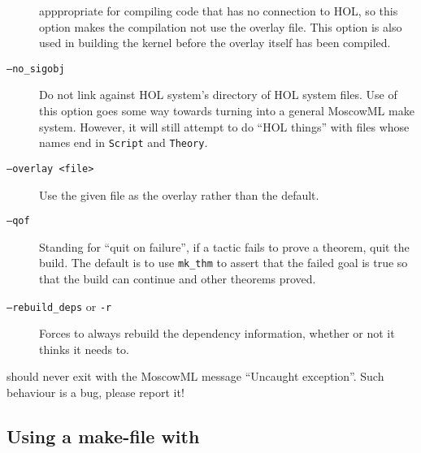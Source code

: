 \begin{description}
  apppropriate for compiling code that has no connection to HOL, so
  this option makes the compilation not use the overlay file.  This
  option is also used in building the kernel before the overlay itself
  has been compiled.
\item[\texttt{--no\_sigobj}] Do not link against HOL system's
  directory of HOL system files.  Use of this option goes some way
  towards turning
  \holmake{} into a general MoscowML \textsf{make} system.  However,
  it will still attempt to do ``HOL things'' with files whose names
  end in \texttt{Script} and \texttt{Theory}.
\item[\texttt{--overlay <file>}] Use the given file as the overlay
  rather than the default.
\item[\texttt{--qof}] Standing for ``quit on failure'', if a tactic
  fails to prove a theorem, quit the build.  The default is to use
  \texttt{mk\_thm} to assert that the failed goal is true so that the
  build can continue and other theorems proved.
\item[{\tt --rebuild\_deps} or {\tt -r}] Forces \holmake{} to
  always rebuild the dependency information, whether or not it thinks
  it needs to.
\end{description}

\noindent \holmake{} should never exit with the MoscowML message ``Uncaught
exception''.  Such behaviour is a bug, please report it!


\subsection{Using a make-file with \holmake}
\label{sec:using-Holmakefiles}

